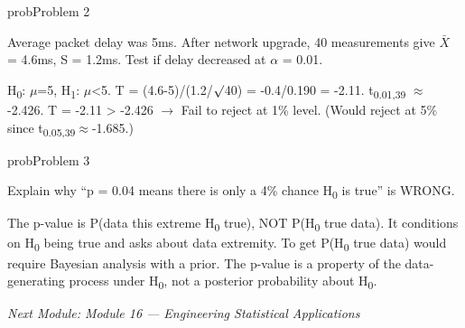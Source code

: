 \begin{PSbox}[unbreakable]{prob}{Problem 2}

Average packet delay was 5ms. After network upgrade, 40 measurements give \ensuremath{\bar{X}} = 4.6ms, S = 1.2ms. Test if delay decreased at \ensuremath{\alpha} = 0.01.

\PSsolution{} H\textsubscript{0}: \ensuremath{\mu}=5, H\textsubscript{1}: \ensuremath{\mu}\textless{}5. T = (4.6-5)/(1.2/\ensuremath{\surd}40) = -0.4/0.190 = -2.11. t\textsubscript{0.01,39} \ensuremath{\approx} -2.426. T = -2.11 \textgreater{} -2.426 \ensuremath{\to} Fail to reject at 1\% level. (Would reject at 5\% since t\textsubscript{0.05,39}\ensuremath{\approx}-1.685.)

\end{PSbox}

\begin{PSbox}[unbreakable]{prob}{Problem 3}

Explain why ``p = 0.04 means there is only a 4\% chance H\textsubscript{0} is true'' is WRONG.

\PSsolution{} The p-value is P(data this extreme \textbar{} H\textsubscript{0} true), NOT P(H\textsubscript{0} true \textbar{} data). It conditions on H\textsubscript{0} being true and asks about data extremity. To get P(H\textsubscript{0} true \textbar{} data) would require Bayesian analysis with a prior. The p-value is a property of the data-generating process under H\textsubscript{0}, not a posterior probability about H\textsubscript{0}.

\emph{Next Module: {Module 16 — Engineering Statistical Applications}}

\end{PSbox}
